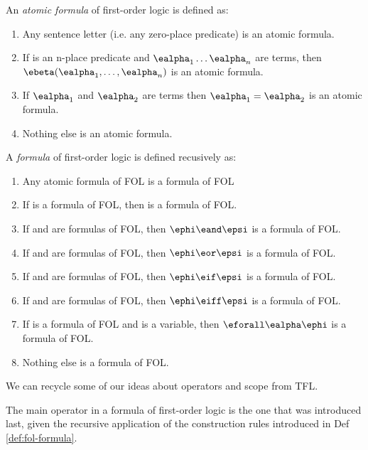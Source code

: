 \begin{definition}
  \label{def:fol-atomic-formula}
  An \emph{atomic formula} of first-order logic is defined as:\\
  \begin{enumerate}
  \item Any sentence letter (i.e. any zero-place predicate) is an atomic
    formula.
  \item If \ebeta is an n-place predicate and $\ealpha_1\dots\ealpha_n$ are
    terms, then $\ebeta(\ealpha_1,\dots,\ealpha_n)$ is an atomic formula.
  \item If $\ealpha_1$ and $\ealpha_2$ are terms then $\ealpha_1=\ealpha_2$ is an
    atomic formula.
  \item Nothing else is an atomic formula. 
  \end{enumerate}
\end{definition}

\begin{definition}[Formula]
  \label{def:fol-formula}
  A \emph{formula} of first-order logic is defined recusively as:\\
  \begin{enumerate}
    \item Any atomic formula of FOL is a formula of FOL
    \item If \ephi is a formula of FOL, then \enot\ephi is a formula of FOL.
    \item If \ephi and \epsi are formulas of FOL, then $\ephi\eand\epsi$ is a
      formula of FOL.
    \item If \ephi and \epsi are formulas of FOL, then $\ephi\eor\epsi$ is a
      formula of FOL.
    \item If \ephi and \epsi are formulas of FOL, then $\ephi\eif\epsi$ is a
      formula of FOL.
    \item If \ephi and \epsi are formulas of FOL, then $\ephi\eiff\epsi$ is a
      formula of FOL.
    \item If \ephi is a formula of FOL and \ealpha is a variable, then
      $\eforall\ealpha\ephi$ is a formula of FOL.
    \item Nothing else is a formula of FOL.
  \end{enumerate}
\end{definition}

We can recycle some of our ideas about operators and scope from TFL.

\begin{definition}
  \label{def:fol-main-operator}
  The main operator in a formula of first-order logic is the one that was
  introduced last, given the recursive application of the construction rules
  introduced in Def \ref{def:fol-formula}.
\end{definition}

